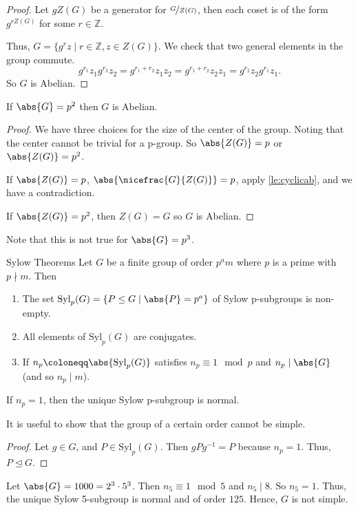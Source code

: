 \begin{proof}
    Let \(gZ(G)\) be a generator for \(\nicefrac{G}{Z(G)}\), then each coset is of the form \(g^{rZ(G)}\) for some \(r \in \mathbb{Z}\).

    Thus, \(G = \{g^{r}z\mid r\in \mathbb{Z}, z\in Z(G)\}\). We check that two general elements in the group commute.
    \[
        g^{r_1}z_1 g^{r_2}z_2 = g^{r_1 + r_2}z_{1}z_2= g^{r_1 + r_2}z_{2}z_1=g^{r_2}z_2 g^{r_1}z_1.
    \]
    So \(G\) is Abelian.
\end{proof}
\begin{corollary}{}{}
    If \(\abs{G} =p^2\) then \(G\) is Abelian.
\end{corollary}
\begin{proof}
    We have three choices for the size of the center of the group. Noting that the center cannot be trivial for a p-group. So \(\abs{Z(G)} = p\) or \(\abs{Z(G)} = p^2\).

    If \(\abs{Z(G)} = p\), \(\abs{\nicefrac{G}{Z(G)}} = p\), apply \cref{le:cyclicab}, and we have a contradiction.

    If \(\abs{Z(G)} = p^2\), then \(Z(G) = G\) so \(G\) is Abelian.
\end{proof}
Note that this is not true for \(\abs{G} = p^3\).
\begin{theorem}{Sylow Theorems}{}
    Let \(G\) be a finite group of order \(p^a m\) where \(p\) is a prime with \(p \nmid m\). Then
    \begin{enumerate}
        \item The set \(\mathrm{Syl}_p(G) = \{P \leq G\mid \abs{P} = p^a\}\) of Sylow p-subgroups is non-empty.
        \item All elements of \(\mathrm{Syl}_p(G)\) are conjugates.
        \item If \(n_p\coloneqq \abs{\mathrm{Syl}_p(G)} \) satisfies \(n_p \equiv 1 \mod p\) and \(n_p \mid \abs{G} \) (and so \(n_p\mid m\)).
    \end{enumerate}
\end{theorem}
\begin{corollary}{}{}
    If \(n_p = 1\), then the unique Sylow p-subgroup is normal.
\end{corollary}
It is useful to show that the group of a certain order cannot be simple.
\begin{proof}
    Let \(g \in G\), and \(P \in \mathrm{Syl}_p(G)\). Then \(gPg^{-1} = P\) because \(n_p = 1\). Thus, \(P \trianglelefteq G\).
\end{proof}
\begin{example}
    Let \(\abs{G} = 1000 = 2^3\cdot 5^3\). Then \(n_5 \equiv 1 \mod 5\) and \(n_5 \mid 8\). So \(n_5 = 1\). Thus, the unique Sylow 5-subgroup is normal and of order \(125\). Hence, \(G\) is not simple.
\end{example}
